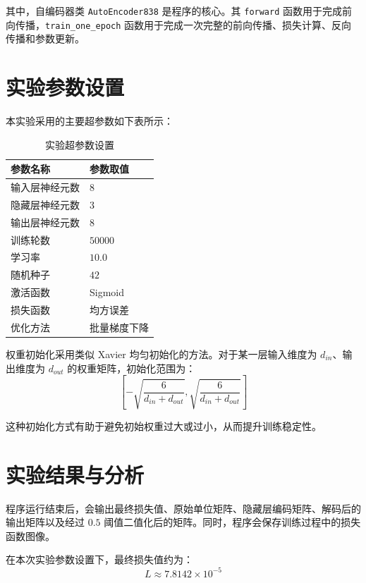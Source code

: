 \documentclass[UTF8,a4paper,12pt]{ctexart}
\begin{document}
其中，自编码器类 \verb|AutoEncoder838| 是程序的核心。其 \verb|forward| 函数用于完成前向传播，\verb|train_one_epoch| 函数用于完成一次完整的前向传播、损失计算、反向传播和参数更新。

\section{实验参数设置}

本实验采用的主要超参数如下表所示：

\begin{table}[H]
    \centering
    \caption{实验超参数设置}
    \begin{tabular}{ll}
        \toprule
        参数名称 & 参数取值 \\
        \midrule
        输入层神经元数 & $8$ \\
        隐藏层神经元数 & $3$ \\
        输出层神经元数 & $8$ \\
        训练轮数 & $50000$ \\
        学习率 & $10.0$ \\
        随机种子 & $42$ \\
        激活函数 & Sigmoid \\
        损失函数 & 均方误差 \\
        优化方法 & 批量梯度下降 \\
        \bottomrule
    \end{tabular}
\end{table}

权重初始化采用类似 Xavier 均匀初始化的方法。对于某一层输入维度为 $d_{in}$、输出维度为 $d_{out}$ 的权重矩阵，初始化范围为：
\begin{equation}
    \left[-\sqrt{\frac{6}{d_{in}+d_{out}}},\sqrt{\frac{6}{d_{in}+d_{out}}}\right]
\end{equation}

这种初始化方式有助于避免初始权重过大或过小，从而提升训练稳定性。

\section{实验结果与分析}

程序运行结束后，会输出最终损失值、原始单位矩阵、隐藏层编码矩阵、解码后的输出矩阵以及经过 $0.5$ 阈值二值化后的矩阵。同时，程序会保存训练过程中的损失函数图像。

在本次实验参数设置下，最终损失值约为：
\begin{equation}
    L \approx 7.8142 \times 10^{-5}
\end{equation}
\end{document}

